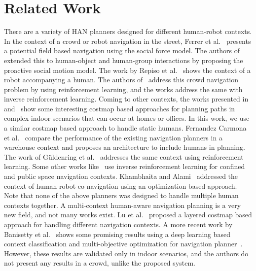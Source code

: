 \section{Related Work}\label{chap4_rl}
There are a variety of HAN planners designed for different human-robot contexts. In the context of a crowd or robot navigation in the street, Ferrer et al.~\cite{ferrer2013social} presents a potential field based navigation using the social force model. The authors of~\cite{truong_toward_2017} extended this to human-object and human-group interactions by proposing the proactive social motion model. The work by Repiso et al.~\cite{repiso2017line} shows the context of a robot accompanying a human. The authors of~\cite{chen2017socially} address this crowd navigation problem by using reinforcement learning, and the works \cite{triebel2016spencer, okal2016learning} address the same with inverse reinforcement learning. Coming to other contexts, the works presented in~\cite{sisbot_tr_2007,truong2014dynamic} and~\cite{kollmitz2015time} show some interesting costmap based approaches for planning paths in complex indoor scenarios that can occur at homes or offices. In this work, we use a similar costmap based approach to handle static humans. Fernandez Carmona et al.~\cite{carmona2019making} compare the performance of the existing navigation planners in a warehouse context and proposes an architecture to include humans in planning. The work of G\"{u}ldenring et al.~\cite{guldenring2020learning} addresses the same context using reinforcement learning. Some other works like~\cite{perez-higueras_robot_2014, perez2018teaching} use inverse reinforcement learning for confined and public space navigation contexts. Khambhaita and Alami~\cite{khambhaita2017viewing} addressed the context of human-robot co-navigation using an optimization based approach. Note that none of the above planners was designed to handle multiple human contexts together. A multi-context human-aware navigation planning is a very new field, and not many works exist. Lu et al.~\cite{lu_iros_2014} proposed a layered costmap based approach for handling different navigation contexts. A more recent work by Banisetty et al.~\cite{banisetty2020deep} shows some promising results using a deep learning based context classification and multi-objective optimization for navigation planner~\cite{banisetty2019socially}. However, these results are validated only in indoor scenarios, and the authors do not present any results in a crowd, unlike the proposed system.

